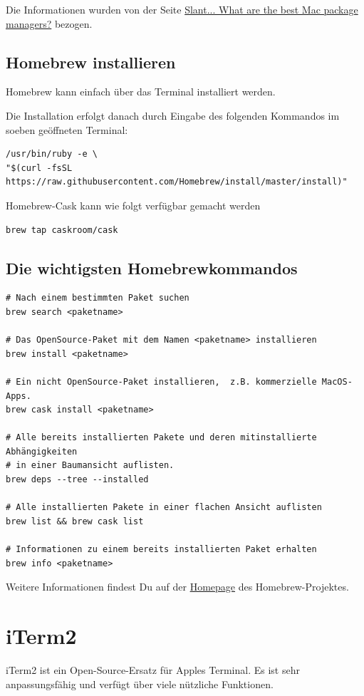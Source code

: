 \documentclass[]{article}
\begin{document}
Die Informationen wurden von der Seite \href{https://www.slant.co/topics/511/~best-mac-package-managers#3}{Slant...  What are the best Mac package managers?} bezogen.

\subsection{Homebrew installieren}
Homebrew kann einfach über das Terminal installiert werden.

Die Installation erfolgt danach durch Eingabe des folgenden Kommandos im soeben geöffneten Terminal:
\begin{verbatim}
/usr/bin/ruby -e \
"$(curl -fsSL https://raw.githubusercontent.com/Homebrew/install/master/install)"
\end{verbatim}

Homebrew-Cask kann wie folgt verfügbar gemacht werden
\begin{verbatim}
brew tap caskroom/cask
\end{verbatim}

\subsection{Die wichtigsten Homebrewkommandos}
\begin{verbatim}
# Nach einem bestimmten Paket suchen
brew search <paketname> 

# Das OpenSource-Paket mit dem Namen <paketname> installieren
brew install <paketname>

# Ein nicht OpenSource-Paket installieren,  z.B. kommerzielle MacOS-Apps.
brew cask install <paketname>  

# Alle bereits installierten Pakete und deren mitinstallierte Abhängigkeiten 
# in einer Baumansicht auflisten.
brew deps --tree --installed

# Alle installierten Pakete in einer flachen Ansicht auflisten
brew list && brew cask list

# Informationen zu einem bereits installierten Paket erhalten
brew info <paketname> 
\end{verbatim}

Weitere Informationen findest Du auf der \href{https://brew.sh/index_de}{Homepage} des Homebrew-Projektes.

\section{iTerm2}
iTerm2 ist ein Open-Source-Ersatz für Apples Terminal. Es ist sehr anpassungsfähig und verfügt über viele nützliche Funktionen.
\end{document}
